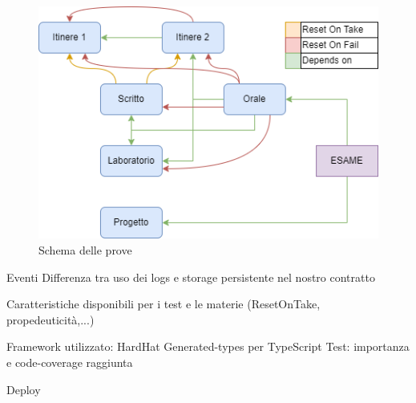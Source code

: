 \begin{figure}
    \centering
    \includegraphics[width=0.75\columnwidth]{img/TestGraph.png}
    \caption{Schema delle prove}
    \label{fig:testGraph}
\end{figure}

%
\pagebreak
Eventi
Differenza tra uso dei logs e storage persistente nel nostro contratto

Caratteristiche disponibili per i test e le materie (ResetOnTake, propedeuticità,...)

Framework utilizzato: HardHat
Generated-types per TypeScript
Test: importanza e code-coverage raggiunta

Deploy




